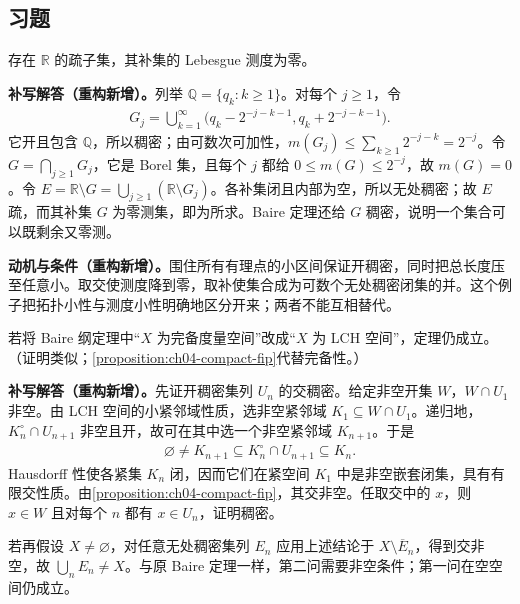 \documentclass[../../main.tex]{subfiles}
\begin{document}
\subsection*{习题}
\begin{exercise}\label{exercise:ch05-meager-full-measure}
存在 $\mathbb R$ 的疏子集，其补集的 Lebesgue 测度为零。
\end{exercise}
\begin{solution}
\textbf{补写解答（重构新增）。}列举 $\mathbb Q=\{q_k:k\ge1\}$。对每个 $j\ge1$，令
\begin{align*}
G_j=\bigcup_{k=1}^{\infty}\bigl(q_k-2^{-j-k-1},q_k+2^{-j-k-1}\bigr).
\end{align*}
它开且包含 $\mathbb Q$，所以稠密；由可数次可加性，$m(G_j)\le\sum_{k\ge1}2^{-j-k}=2^{-j}$。令 $G=\bigcap_{j\ge1}G_j$，它是 Borel 集，且每个 $j$ 都给 $0\le m(G)\le2^{-j}$，故 $m(G)=0$。令 $E=\mathbb R\setminus G=\bigcup_{j\ge1}(\mathbb R\setminus G_j)$。各补集闭且内部为空，所以无处稠密；故 $E$ 疏，而其补集 $G$ 为零测集，即为所求。Baire 定理还给 $G$ 稠密，说明一个集合可以既剩余又零测。
\end{solution}
\begin{remark}
\textbf{动机与条件（重构新增）。}围住所有有理点的小区间保证开稠密，同时把总长度压至任意小。取交使测度降到零，取补使集合成为可数个无处稠密闭集的并。这个例子把拓扑小性与测度小性明确地区分开来；两者不能互相替代。
\end{remark}
\begin{exercise}\label{exercise:ch05-lch-baire}
若将 Baire 纲定理中“$X$ 为完备度量空间”改成“$X$ 为 LCH 空间”，定理仍成立。（证明类似；\cref{proposition:ch04-compact-fip}代替完备性。）
\end{exercise}
\begin{solution}
\textbf{补写解答（重构新增）。}先证开稠密集列 $U_n$ 的交稠密。给定非空开集 $W$，$W\cap U_1$ 非空。由 LCH 空间的小紧邻域性质，选非空紧邻域 $K_1\subseteq W\cap U_1$。递归地，$K_n^\circ\cap U_{n+1}$ 非空且开，故可在其中选一个非空紧邻域 $K_{n+1}$。于是
\begin{align*}
\varnothing\ne K_{n+1}\subseteq K_n^\circ\cap U_{n+1}\subseteq K_n.
\end{align*}
Hausdorff 性使各紧集 $K_n$ 闭，因而它们在紧空间 $K_1$ 中是非空嵌套闭集，具有有限交性质。由\cref{proposition:ch04-compact-fip}，其交非空。任取交中的 $x$，则 $x\in W$ 且对每个 $n$ 都有 $x\in U_n$，证明稠密。

若再假设 $X\ne\varnothing$，对任意无处稠密集列 $E_n$ 应用上述结论于 $X\setminus\overline E_n$，得到交非空，故 $\bigcup_nE_n\ne X$。与原 Baire 定理一样，第二问需要非空条件；第一问在空空间仍成立。
\end{solution}
\end{document}
